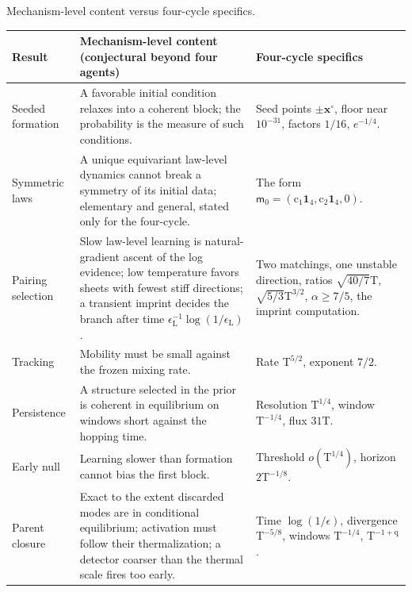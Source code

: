 \begin{sciencetable}{Mechanism-level content versus four-cycle specifics.}
\label{comp:tab-ch14-toy}
\small
\begin{tabularx}{\textwidth}{>{\raggedright\arraybackslash}p{}>{\raggedright\arraybackslash}X>{\raggedright\arraybackslash}p{}}
\toprule
\textbf{Result} & \textbf{Mechanism-level content (conjectural beyond four agents)} & \textbf{Four-cycle specifics}\\
\midrule
Seeded formation & A favorable initial condition relaxes into a coherent block; the probability is the measure of such conditions. & Seed points $\pm\mathbf x^\circ$, floor near $10^{-31}$, factors $1/16$, $e^{-1/4}$. \\
Symmetric laws & A unique equivariant law-level dynamics cannot break a symmetry of its initial data; elementary and general, stated only for the four-cycle. & The form $\mathsf m_0=(\mathrm c_1\mathbf 1_4,\mathrm c_2\mathbf 1_4,0)$. \\
Pairing selection & Slow law-level learning is natural-gradient ascent of the log evidence; low temperature favors sheets with fewest stiff directions; a transient imprint decides the branch after time $\epsilon_{\mathrm L}^{-1}\log(1/\epsilon_{\mathrm L})$. & Two matchings, one unstable direction, ratios $\sqrt{40/7}\mathrm T$, $\sqrt{5/3}\mathrm T^{3/2}$, $\alpha\ge7/5$, the imprint computation. \\
Tracking & Mobility must be small against the frozen mixing rate. & Rate $\mathrm T^{5/2}$, exponent $7/2$. \\
Persistence & A structure selected in the prior is coherent in equilibrium on windows short against the hopping time. & Resolution $\mathrm T^{1/4}$, window $\mathrm T^{-1/4}$, flux $31\mathrm T$. \\
Early null & Learning slower than formation cannot bias the first block. & Threshold $o(\mathrm T^{1/4})$, horizon $2\mathrm T^{-1/8}$. \\
Parent closure & Exact to the extent discarded modes are in conditional equilibrium; activation must follow their thermalization; a detector coarser than the thermal scale fires too early. & Time $\log(1/\epsilon)$, divergence $\mathrm T^{-5/8}$, windows $\mathrm T^{-1/4}$, $\mathrm T^{-1+\mathrm q}$. \\
\bottomrule
\end{tabularx}
\end{sciencetable}

